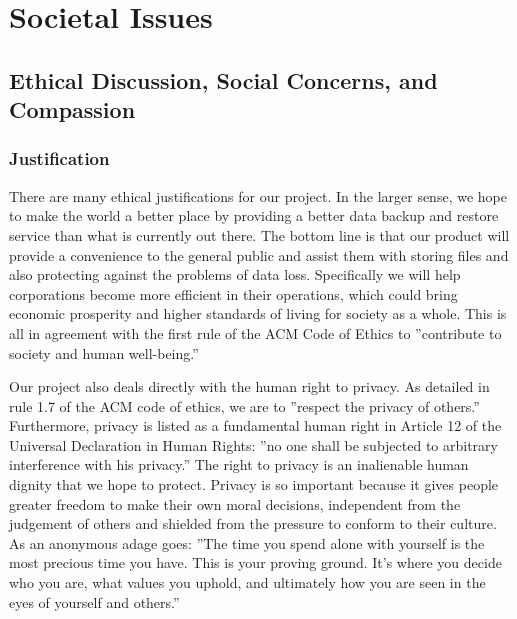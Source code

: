 \chapter{Societal Issues}

\section{Ethical Discussion, Social Concerns, and Compassion}

\subsection{Justification}
	There are many ethical justifications for our project.  In the larger sense, we hope to make the world a better place by providing a better data backup and restore service than what is currently out there.  The bottom line is that our product will provide a convenience to the general public and assist them with storing files and also protecting against the problems of data loss.  Specifically we will help corporations become more efficient in their operations, which could bring economic prosperity and higher standards of living for society as a whole.  This is all in agreement with the first rule of the ACM Code of Ethics to ''contribute to society and human well-being.'' \cite{acmethics}

	Our project also deals directly with the human right to privacy.  As detailed in rule 1.7 of the ACM code of ethics, we are to ''respect the privacy of others.'' \cite{acmethics}  Furthermore, privacy is listed as a fundamental human right in Article 12 of the Universal Declaration in Human Rights: ''no one shall be subjected to arbitrary interference with his privacy.'' \cite{udhr}  The right to privacy is an inalienable human dignity that we hope to protect.  Privacy is so important because it gives people greater freedom to make their own moral decisions, independent from the judgement of others and shielded from the pressure to conform to their culture.  As an anonymous adage goes: ''The time you spend alone with yourself is the most precious time you have.  This is your proving ground.  It’s where you decide who you are, what values you uphold, and ultimately how you are seen in the eyes of yourself and others.'' \cite{wolf}

